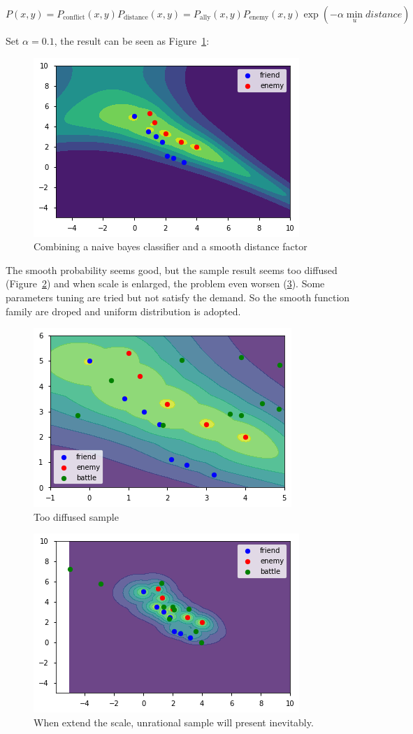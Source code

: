 \documentclass{article}
\begin{document}
$$
P(x,y) = P_{\text{conflict}}(x,y) P_{\text{distance}}(x,y) = 
P_\text{ally}(x,y) P_\text{enemy}(x,y) \exp(-\alpha \min_{u} distance)
$$

Set $\alpha=0.1$, the result can be seen as Figure~\ref{fig:combOne}:

\begin{figure}[h]
\includegraphics[width=0.6\linewidth]{comb1.png}
\caption{Combining a naive bayes classifier and a smooth distance factor}
\label{fig:combOne}
\end{figure}

The smooth probability seems good, but the sample result seems too diffused 
(Figure~\ref{fig:combTwo}) and when scale is enlarged, the problem even worsen (\ref{fig:combThree}).
Some parameters tuning are tried but not satisfy the demand. So the smooth function family are droped 
and uniform distribution is adopted. 

\begin{figure}[h]
\includegraphics[width=0.6\linewidth]{comb2.png}
\caption{Too diffused sample}
\label{fig:combTwo}
\end{figure}

\begin{figure}[h]
\includegraphics[width=0.6\linewidth]{comb4.png}
\caption{When extend the scale, unrational sample will present inevitably.}
\label{fig:combThree}
\end{figure}
\end{document}
